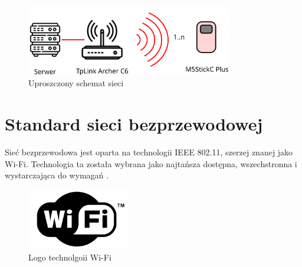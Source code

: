 \documentclass[12pt,oneside,a4paper]{book}
\theoremstyle{break}
\begin{document}
\begin{figure}
    \begin{center}
        \includegraphics[width=0.8\textwidth]{schemat_polaczenia_w_sieci.png}        
        \caption{Uproszczony schemat sieci}        
        \label{rys:upr-schemat-sieci}
    \end{center}
\end{figure}

\section{Standard sieci bezprzewodowej}
Sieć bezprzewodowa jest oparta na technologii IEEE 802.11, szerzej znanej jako Wi-Fi.
Technologia ta została wybrana jako najtańsza dostępna, wszechstronna i wystarczająca
do wymagań \cite{networking}. 

\begin{figure}
    \begin{center}
        \includegraphics[width=0.4\textwidth]{logo_wifi.png}        
        \caption{Logo technolgoii Wi-Fi}        
    \end{center}
\end{figure}
\end{document}
